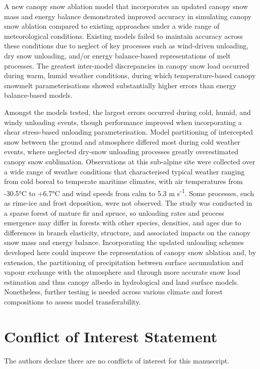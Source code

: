 \documentclass[
]{agujournal2019}
\begin{document}
A new canopy snow ablation model that incorporates an updated canopy
snow mass and energy balance demonstrated improved accuracy in
simulating canopy snow ablation compared to existing approaches under a
wide range of meteorological conditions. Existing models failed to
maintain accuracy across these conditions due to neglect of key
processes such as wind-driven unloading, dry snow unloading, and/or
energy balance-based representations of melt processes. The greatest
inter-model discrepancies in canopy snow load occurred during warm,
humid weather conditions, during which temperature-based canopy snowmelt
parameterisations showed substantially higher errors than energy
balance-based models.

Amongst the models tested, the largest errors occurred during cold,
humid, and windy unloading events, though performance improved when
incorporating a shear stress-based unloading parameterisation. Model
partitioning of intercepted snow between the ground and atmosphere
differed most during cold weather events, where neglected dry-snow
unloading processes greatly overestimated canopy snow sublimation.
Observations at this sub-alpine site were collected over a wide range of
weather conditions that characterised typical weather ranging from cold
boreal to temperate maritime climates, with air temperatures from
-30.5°C to +6.7°C and wind speeds from calm to 5.3 m
s\textsuperscript{-1}. Some processes, such as rime-ice and frost
deposition, were not observed. The study was conducted in a sparse
forest of mature fir and spruce, so unloading rates and process
emergence may differ in forests with other species, densities, and ages
due to differences in branch elasticity, structure, and associated
impacts on the canopy snow mass and energy balance. Incorporating the
updated unloading schemes developed here could improve the
representation of canopy snow ablation and, by extension, the
partitioning of precipitation between surface accumulation and vapour
exchange with the atmosphere and through more accurate snow load
estimation and thus canopy albedo in hydrological and land surface
models. Nonetheless, further testing is needed across various climate
and forest compositions to assess model transferability.

\section{Conflict of Interest
Statement}\label{conflict-of-interest-statement}

The authors declare there are no conflicts of interest for this
manuscript.
\end{document}
